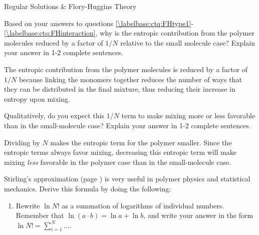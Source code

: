 \begin{activity}{Regular Solutions \& Flory-Huggins Theory}
\begin{infobox}
\end{infobox}

\begin{ctqs}

		\question Based on your answers to questions \ref{\labelbase:ctq:FHtype1}-\ref{\labelbase:ctq:FHinteraction}, why is the entropic contribution from the polymer molecules reduced by a factor of $1/N$ relative to the small molecule case? Explain your answer in 1-2 complete sentences.
		
			\begin{solution}[1.75in]
			
				The entropic contribution from the polymer molecules is reduced by a factor of $1/N$ because linking the monomers together reduces the number of ways that they can be distributed in the final mixture, thus reducing their increase in entropy upon mixing.
			
			\end{solution}
		
		\question Qualitatively, do you expect this $1/N$ term to make mixing more or less favorable than in the small-molecule case?  Explain your answer in 1-2 complete sentences.
		
			\begin{solution}[2in]
			
				Dividing by $N$ makes the entropic term for the polymer smaller.  Since the entropic terms always favor mixing, decreasing this entropic term will make mixing \emph{less} favorable in the polymer case than in the small-molecule case.
			
			\end{solution}
			
\end{ctqs}

\begin{exercises}

		\exercise Stirling's approximation (page \pageref{eqn:stirling}) is very useful in polymer physics and statistical mechanics.  Derive this formula by doing the following:
			\begin{enumerate}
				\item Rewrite $\ln N!$ as a summation of logarithms of individual numbers.  Remember that $\ln (a\cdot b) = \ln a + \ln b$, and write your answer in the form $\ln N! = \sum_{i=1}^N \dots$.
				
					\begin{solution}\end{solution}
					

\end{enumerate}
\end{exercises}
\end{activity}
